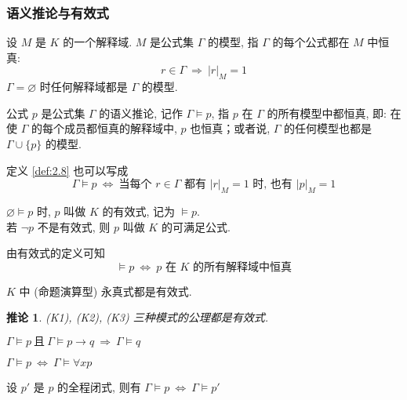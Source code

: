 \documentclass[
    color=black,
    device=normal,
    lang=cn
]{elegantnote}
\newtheorem{deduction}{推论}[subsection]
\begin{document}
\subsubsection{语义推论与有效式}
\begin{definition}[模型]
    设 $M$ 是 $K$ 的一个解释域.  $M$ 是公式集 $\Gamma$ 的模型, 指 $\Gamma$ 的每个公式都在 $M$ 中恒真:
    $$
        r\in \Gamma\ \Rightarrow\  \lvert r\rvert_M=1
    $$
    $\Gamma=\varnothing$ 时任何解释域都是 $\Gamma$ 的模型.
\end{definition}
\begin{definition}[语义推论]\label{def:2.8}
    公式 $p$ 是公式集 $\Gamma$ 的语义推论, 记作 $\Gamma\vDash p$, 指 $p$ 在 $\Gamma$ 的所有模型中都恒真, 即: 在使 $\Gamma$ 的每个成员都恒真的解释域中, $p$ 也恒真；或者说, $\Gamma$ 的任何模型也都是 $\Gamma\cup \{p\}$ 的模型.
\end{definition}
定义 \ref{def:2.8} 也可以写成
$$
    \Gamma\vDash p\ \Leftrightarrow\ \text{当每个 $r\in\Gamma$ 都有 $\lvert r\rvert_M=1$ 时, 也有 $\lvert p\rvert_M = 1$}
$$
\begin{definition}[有效式与满足公式]
    $\varnothing\vDash p$ 时, $p$ 叫做 $K$ 的有效式, 记为 $\vDash p$.\\
    若 $\lnot p$ 不是有效式, 则 $p$ 叫做 $K$ 的可满足公式.
\end{definition}
由有效式的定义可知
$$
    \vDash p \ \Leftrightarrow\ \text{$p$ 在 $K$ 的所有解释域中恒真}
$$
\begin{proposition}
    $K$ 中 (命题演算型) 永真式都是有效式.
\end{proposition}
\begin{deduction}
    (K1), (K2), (K3) 三种模式的公理都是有效式.
\end{deduction}
\begin{proposition}
    $\Gamma\vDash p\ \text{且}\ \Gamma\vDash p\to q\ \Rightarrow\  \Gamma\vDash q$
\end{proposition}
\begin{proposition}
    $\Gamma\vDash p\ \Leftrightarrow\ \Gamma\vDash\forall xp$
\end{proposition}
\begin{proposition}
    设 $p'$ 是 $p$ 的全程闭式, 则有 $\Gamma\vDash p\ \Leftrightarrow\  \Gamma\vDash p'$
\end{proposition}
\end{document}
